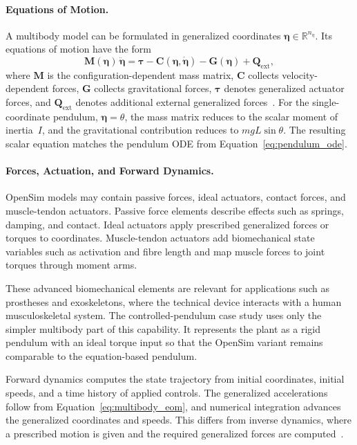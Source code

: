 \paragraph{Equations of Motion.}
A multibody model can be formulated in generalized coordinates
\(\boldsymbol{\eta} \in \mathbb{R}^{n_\eta}\).
Its equations of motion have the form
\begin{equation}
    \mathbf{M}(\boldsymbol{\eta})\,\ddot{\boldsymbol{\eta}}
    =
    \boldsymbol{\tau}
    -
    \mathbf{C}(\boldsymbol{\eta},\dot{\boldsymbol{\eta}})
    -
    \mathbf{G}(\boldsymbol{\eta})
    +
    \mathbf{Q}_{\mathrm{ext}},
    \label{eq:multibody_eom}
\end{equation}
where \(\mathbf{M}\) is the configuration-dependent mass matrix, \(\mathbf{C}\) collects velocity-dependent forces, \(\mathbf{G}\) collects gravitational forces, \(\boldsymbol{\tau}\) denotes generalized actuator forces, and \(\mathbf{Q}_{\mathrm{ext}}\) denotes additional external generalized forces~\cite{OpenSim_Delp,seth_opensim_2018}.
For the single-coordinate pendulum, \(\boldsymbol{\eta}=\theta\), the mass matrix reduces to the scalar moment of inertia~\(I\), and the gravitational contribution reduces to \(mgL\sin\theta\).
The resulting scalar equation matches the pendulum \ac{ODE} from Equation~\eqref{eq:pendulum_ode}.

\paragraph{Forces, Actuation, and Forward Dynamics.}
OpenSim models may contain passive forces, ideal actuators, contact forces, and muscle-tendon actuators.
Passive force elements describe effects such as springs, damping, and contact.
Ideal actuators apply prescribed generalized forces or torques to coordinates.
Muscle-tendon actuators add biomechanical state variables such as activation and fibre length and map muscle forces to joint torques through moment arms.

These advanced biomechanical elements are relevant for applications such as prostheses and exoskeletons, where the technical device interacts with a human musculoskeletal system.
The controlled-pendulum case study uses only the simpler multibody part of this capability.
It represents the plant as a rigid pendulum with an ideal torque input so that the OpenSim variant remains comparable to the equation-based pendulum.

Forward dynamics computes the state trajectory from initial coordinates, initial speeds, and a time history of applied controls.
The generalized accelerations follow from Equation~\eqref{eq:multibody_eom}, and numerical integration advances the generalized coordinates and speeds.
This differs from inverse dynamics, where a prescribed motion is given and the required generalized forces are computed~\cite{OpenSim_Delp,seth_opensim_2018}.

